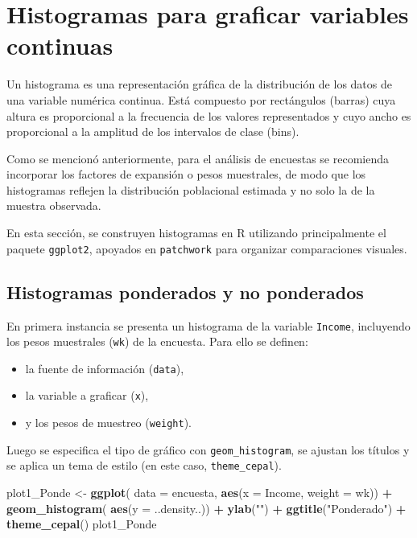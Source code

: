 \documentclass[
  spanish,
  12pt,
]{book}
\newenvironment{Shaded}{\begin{snugshade}}{\end{snugshade}}
\newcommand{\AttributeTok}[1]{\textcolor[rgb]{0.13,0.29,0.53}{#1}}
\newcommand{\FunctionTok}[1]{\textcolor[rgb]{0.13,0.29,0.53}{\textbf{#1}}}
\newcommand{\NormalTok}[1]{#1}
\newcommand{\OtherTok}[1]{\textcolor[rgb]{0.56,0.35,0.01}{#1}}
\newcommand{\SpecialCharTok}[1]{\textcolor[rgb]{0.81,0.36,0.00}{\textbf{#1}}}
\newcommand{\StringTok}[1]{\textcolor[rgb]{0.31,0.60,0.02}{#1}}
\providecommand{\tightlist}{%
  \setlength{\itemsep}{0pt}\setlength{\parskip}{0pt}}
\begin{document}
\section{Histogramas para graficar variables continuas}\label{histogramas-para-graficar-variables-continuas}

Un histograma es una representación gráfica de la distribución de los datos de una variable numérica continua. Está compuesto por rectángulos (barras) cuya altura es proporcional a la frecuencia de los valores representados y cuyo ancho es proporcional a la amplitud de los intervalos de clase (bins).

Como se mencionó anteriormente, para el análisis de encuestas se recomienda incorporar los factores de expansión o pesos muestrales, de modo que los histogramas reflejen la distribución poblacional estimada y no solo la de la muestra observada.

En esta sección, se construyen histogramas en R utilizando principalmente el paquete \texttt{ggplot2}, apoyados en \texttt{patchwork} para organizar comparaciones visuales.

\subsection{Histogramas ponderados y no ponderados}\label{histogramas-ponderados-y-no-ponderados}

En primera instancia se presenta un histograma de la variable \texttt{Income}, incluyendo los pesos muestrales (\texttt{wk}) de la encuesta. Para ello se definen:

\begin{itemize}
\tightlist
\item
  la fuente de información (\texttt{data}),
\item
  la variable a graficar (\texttt{x}),
\item
  y los pesos de muestreo (\texttt{weight}).
\end{itemize}

Luego se especifica el tipo de gráfico con \texttt{geom\_histogram}, se ajustan los títulos y se aplica un tema de estilo (en este caso, \texttt{theme\_cepal}).

\begin{Shaded}
\begin{Highlighting}[]
\NormalTok{plot1\_Ponde }\OtherTok{\textless{}{-}} \FunctionTok{ggplot}\NormalTok{(}
  \AttributeTok{data =}\NormalTok{ encuesta,              }
  \FunctionTok{aes}\NormalTok{(}\AttributeTok{x =}\NormalTok{ Income, }\AttributeTok{weight =}\NormalTok{ wk)) }\SpecialCharTok{+}
  \FunctionTok{geom\_histogram}\NormalTok{(               }
    \FunctionTok{aes}\NormalTok{(}\AttributeTok{y =}\NormalTok{ ..density..)) }\SpecialCharTok{+}        
  \FunctionTok{ylab}\NormalTok{(}\StringTok{""}\NormalTok{) }\SpecialCharTok{+}                   
  \FunctionTok{ggtitle}\NormalTok{(}\StringTok{"Ponderado"}\NormalTok{) }\SpecialCharTok{+}        
  \FunctionTok{theme\_cepal}\NormalTok{()  }
\NormalTok{plot1\_Ponde}
\end{Highlighting}
\end{Shaded}
\end{document}
